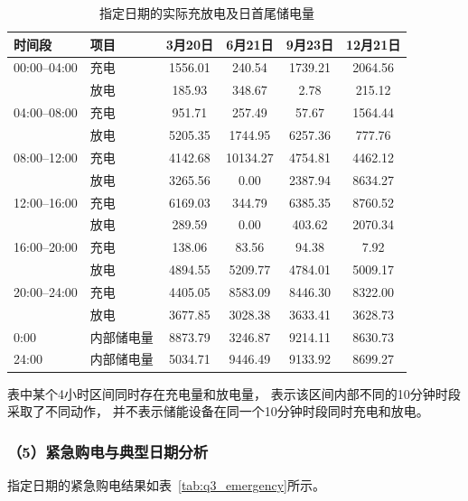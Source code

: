 \begin{table}[htbp]
\centering
\caption{指定日期的实际充放电及日首尾储电量}
\label{tab:q3_storage}
\begin{tabular}{llcccc}
\hline
时间段 & 项目
& 3月20日
& 6月21日
& 9月23日
& 12月21日 \\
\hline
00:00--04:00 & 充电 & 1556.01 & 240.54  & 1739.21 & 2064.56 \\
              & 放电 & 185.93  & 348.67  & 2.78    & 215.12 \\

04:00--08:00 & 充电 & 951.71  & 257.49  & 57.67   & 1564.44 \\
              & 放电 & 5205.35 & 1744.95 & 6257.36 & 777.76 \\

08:00--12:00 & 充电 & 4142.68 & 10134.27 & 4754.81 & 4462.12 \\
              & 放电 & 3265.56 & 0.00     & 2387.94 & 8634.27 \\

12:00--16:00 & 充电 & 6169.03 & 344.79  & 6385.35 & 8760.52 \\
              & 放电 & 289.59  & 0.00    & 403.62  & 2070.34 \\

16:00--20:00 & 充电 & 138.06  & 83.56   & 94.38   & 7.92 \\
              & 放电 & 4894.55 & 5209.77 & 4784.01 & 5009.17 \\

20:00--24:00 & 充电 & 4405.05 & 8583.09 & 8446.30 & 8322.00 \\
              & 放电 & 3677.85 & 3028.38 & 3633.41 & 3628.73 \\
\hline
0:00  & 内部储电量 & 8873.79 & 3246.87 & 9214.11 & 8630.73 \\
24:00 & 内部储电量 & 5034.71 & 9446.49 & 9133.92 & 8699.27 \\
\hline
\end{tabular}
\end{table}

表中某个4小时区间同时存在充电量和放电量，
表示该区间内部不同的10分钟时段采取了不同动作，
并不表示储能设备在同一个10分钟时段同时充电和放电。


\subsubsection*{（5）紧急购电与典型日期分析}

指定日期的紧急购电结果如表~\ref{tab:q3_emergency}所示。

